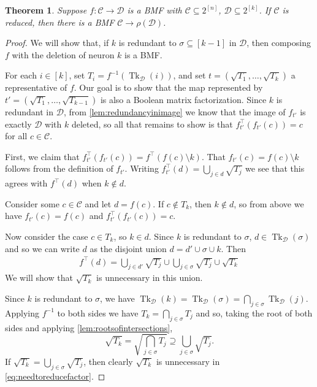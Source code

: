 \documentclass[11pt,letterpaper, reqno]{amsart}
\newtheorem{thm}{Theorem}[section]   %
\theoremstyle{definition}
\DeclareMathOperator{\tk}{Tk}
\def\cC{\mathcal{C}}
\def\cD{\mathcal{D}}
\begin{document}
        \begin{thm}\label{lem:bmfredundancy}
            Suppose $f: \cC \to \cD$ is a BMF with $\cC \subseteq 2^{[n]}$, $\cD \subseteq 2^{[k]}$.
            If $\cC$ is reduced, 
            then there is a BMF $\cC \to \rho(\cD)$. %
        \end{thm}
        \begin{proof}
            We will show that, if $k$ is redundant to $\sigma \subseteq[k-1]$ in $\cD$, then composing $f$ with the deletion of neuron $k$ is a BMF.

            For each $i \in [k]$, set $T_i = f^{-1}(\tk_\cD(i))$, and set $t = (\sqrt{T_1},\dots,\sqrt{T_k})$ a representative of $f$. Our goal is to show that the map represented by $t' = (\sqrt{T_1},\dots,\sqrt{T_{k-1}})$ is also a Boolean matrix factorization. Since $k$ is redundant in $\cD$, from \cref{lem:redundancyinimage} we know that the image of  $f_{t'}$ is exactly $\cD$ with $k$ deleted, so all that remains to show is that $f_{t'}^\top (f_{t'}(c)) = c$ for all $c \in \cC$.
            
            First, we claim that $f_{t'}^\top(f_{t'}(c)) = f^\top(f(c)\setminus k)$.
            That $f_{t'}(c) = f(c) \setminus k$ follows from the definition of $f_{t'}$.
            Writing $f_{t'}^\top(d) = \bigcup_{j\in d} \sqrt{T_j}$ we see that this agrees with $f^\top(d)$ when $k \notin d$.
            
            Consider some $c \in \cC$ and let $d = f(c)$.
            If $c \notin T_k$, then $k \notin d$, so from above we have $f_{t'}(c) = f(c)$ and $f_{t'}^\top (f_{t'}(c)) = c$.

            Now consider the case $c \in T_k$, so $k \in d$.
            Since $k$ is redundant to $\sigma$, $d \in \tk_\cD(\sigma)$ and so we can write $d$ as the disjoint union $d = d' \cup \sigma \cup k$. Then
            \begin{align*}
                f^\top(d) = \bigcup_{j\in d'} \sqrt{T_j} \cup \bigcup_{j\in\sigma} \sqrt{T_j} \cup \sqrt{T_k}\tag{*}\label{eq:needtoreducefactor}
            \end{align*}
            We will show that $\sqrt{T_k}$ is unnecessary in this union.
            
            Since $k$ is redundant to $\sigma$, we have $\tk_\cD(k) = \tk_\cD(\sigma) = \bigcap_{j\in\sigma} \tk_\cD(j)$.
            Applying $f^{-1}$ to both sides we have $T_k = \bigcap_{j\in\sigma} T_j$ and so, taking the root of both sides and applying \cref{lem:rootsofintersections},
            \[ \sqrt{T_k} = \sqrt{\bigcap_{j\in\sigma} T_j} \supseteq \bigcup_{j\in\sigma} \sqrt{T_j}. \]
            If $\sqrt{T_k} = \bigcup_{j\in\sigma} \sqrt{T_j}$, then clearly $\sqrt{T_k}$ is unnecessary in \eqref{eq:needtoreducefactor}.


\end{proof}
\end{document}
